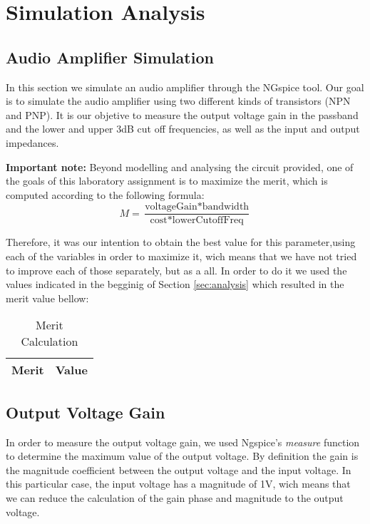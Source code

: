 \section{Simulation Analysis}
\label{sec:simulation}

\subsection{Audio Amplifier Simulation}
\label{subsec:amp_simulation}
\par In this section we simulate an audio amplifier through the NGspice tool. Our goal is to simulate the audio amplifier using two different kinds of transistors (NPN and PNP). It is our objetive to measure the output voltage gain in the passband and the lower and upper 3dB cut off frequencies, as well as the input and output impedances.

\par  \textbf{Important note:} Beyond modelling and analysing the circuit provided, one of the goals of this laboratory assignment is to maximize the merit, which is computed according to the following formula:
\begin{equation}
M = \frac{\text{voltageGain}*\text{bandwidth}}{\text{cost}*\text{lowerCutoffFreq}}
\end{equation}

Therefore, it was our intention to obtain the best value for this parameter,using each of the variables in order to maximize it, wich means that we have not tried to improve each of those separately, but as a all.
In order to do it we used the values indicated in the begginig of Section \ref{sec:analysis} which resulted in the merit value bellow:

\begin{table}[H]
  \centering
  \begin{tabular}{ | m{11cm} | m{3cm}| } 
    \hline    
    {\bf Merit} & {\bf Value} \\ \hline
    
  \end{tabular}
  \caption{Merit Calculation}
  \label{tab:merit}
\end{table}

\subsection{Output Voltage Gain}
\label{output_gain}
\par In order to measure the output voltage gain, we used Ngspice's \textit{measure} function to determine the maximum value of the output voltage. By definition the gain is the magnitude coefficient between the output voltage and the input voltage. In this particular case, the input voltage has a magnitude of 1V, wich means that we can reduce the calculation of the gain phase and magnitude to the output voltage.

